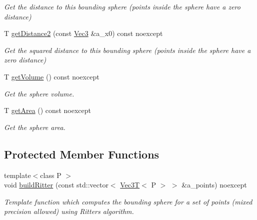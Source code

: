\begin{DoxyCompactItemize}
\begin{DoxyCompactList}\small\item\em Get the distance to this bounding sphere (points inside the sphere have a zero distance) \end{DoxyCompactList}\item 
T \hyperlink{classBoundingVolumes_1_1BoundingSphereT_aee81818917225b65b6c3b661e268e66f}{get\+Distance2} (const \hyperlink{classBoundingVolumes_1_1BoundingSphereT_ad89ed315255abcde216e9ca1de3068ab}{Vec3} \&a\+\_\+x0) const noexcept
\begin{DoxyCompactList}\small\item\em Get the squared distance to this bounding sphere (points inside the sphere have a zero distance) \end{DoxyCompactList}\item 
T \hyperlink{classBoundingVolumes_1_1BoundingSphereT_a44e0069495c19069fced07aab8e614c6}{get\+Volume} () const noexcept
\begin{DoxyCompactList}\small\item\em Get the sphere volume. \end{DoxyCompactList}\item 
T \hyperlink{classBoundingVolumes_1_1BoundingSphereT_a303fd50d1b8d27c7014c50ba0867a0b3}{get\+Area} () const noexcept
\begin{DoxyCompactList}\small\item\em Get the sphere area. \end{DoxyCompactList}\end{DoxyCompactItemize}
\subsection*{Protected Member Functions}
\begin{DoxyCompactItemize}
\item 
\mbox{\label{classBoundingVolumes_1_1BoundingSphereT_abea0326be2d1843f3ad7c6de1ebe2418}} 
{\footnotesize template$<$class P $>$ }\\void \hyperlink{classBoundingVolumes_1_1BoundingSphereT_abea0326be2d1843f3ad7c6de1ebe2418}{build\+Ritter} (const std\+::vector$<$ \hyperlink{classVec3T}{Vec3T}$<$ P $>$ $>$ \&a\+\_\+points) noexcept
\begin{DoxyCompactList}\small\item\em Template function which computes the bounding sphere for a set of points (mixed precision allowed) using Ritter\textquotesingle{}s algorithm. \end{DoxyCompactList}\end{DoxyCompactItemize}
